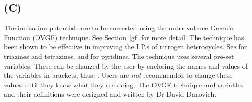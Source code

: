 \subsection*{ (C)}
The ionization potentials are to be corrected using the outer valence Green's
Function (OVGF) technique.  See Section~\ref{gf} for more detail.  The
technique has been shown to be effective in improving the I.P.s of nitrogen
heterocycles. See \cite{gf6} for triazines and tetrazines, and \cite{gf4} for
pyridines. The technique uses several pre-set variables.  These can be changed
by the user by enclosing the names and values of the variables in brackets,
thus: .  Users are {\em not}
recommended to change these values until they know what they are doing.  The
OVGF technique and variables and their  definitions were designed and written
by Dr David Danovich.

